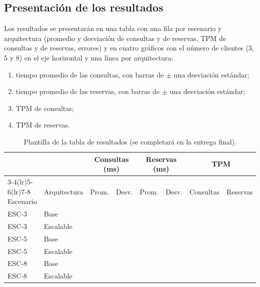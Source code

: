 \subsection{Presentación de los resultados}

Los resultados se presentarán en una tabla con una fila por escenario y
arquitectura (promedio y desviación de consultas y de reservas, TPM de consultas y
de reservas, errores) y en cuatro gráficos con el número de clientes (3, 5 y 8) en
el eje horizontal y una línea por arquitectura:

\begin{enumerate}
    \item tiempo promedio de las consultas, con barras de $\pm$ una desviación estándar;
    \item tiempo promedio de las reservas, con barras de $\pm$ una desviación estándar;
    \item TPM de consultas;
    \item TPM de reservas.
\end{enumerate}

\begin{table}[H]
\centering
\caption{Plantilla de la tabla de resultados (se completará en la entrega final).}
\small
\begin{tabular}{llcccccc}
\toprule
& & \multicolumn{2}{c}{Consultas (ms)} & \multicolumn{2}{c}{Reservas (ms)} & \multicolumn{2}{c}{TPM} \\
\cmidrule(lr){3-4}\cmidrule(lr){5-6}\cmidrule(lr){7-8}
Escenario & Arquitectura & Prom. & Desv. & Prom. & Desv. & Consultas & Reservas \\
\midrule
ESC-3 & Base & & & & & & \\
ESC-3 & Escalable & & & & & & \\
ESC-5 & Base & & & & & & \\
ESC-5 & Escalable & & & & & & \\
ESC-8 & Base & & & & & & \\
ESC-8 & Escalable & & & & & & \\
\bottomrule
\end{tabular}
\end{table}
